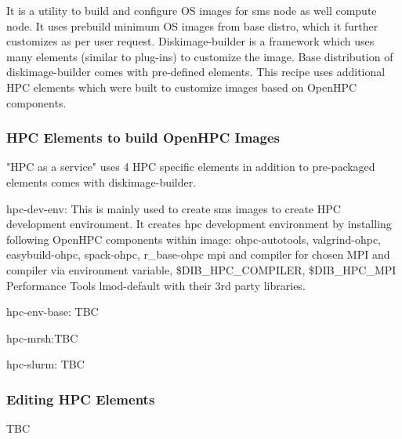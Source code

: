 It is a utility to build and configure OS images for sms node as well compute node. It uses prebuild minimum OS images from base distro, which it further customizes as per user request. Diskimage-builder is a framework which uses many elements (similar to plug-ins) to customize the image. Base distribution of diskimage-builder comes with pre-defined elements. This recipe uses additional HPC elements which were built to customize images based on OpenHPC components.

\subsubsection{HPC Elements to build OpenHPC Images}

"HPC as a service" uses 4 HPC specific elements in addition to pre-packaged elements comes with diskimage-builder.

hpc-dev-env: 
	This is mainly used to create sms images to create HPC development environment. It creates hpc development environment by installing following OpenHPC components within image: 
		ohpc-autotools, valgrind-ohpc, easybuild-ohpc, spack-ohpc, r\_base-ohpc
		mpi and compiler for chosen MPI and compiler via environment variable, \$DIB\_HPC\_COMPILER, \$DIB\_HPC\_MPI
		Performance Tools lmod-default with their 3rd party libraries.

hpc-env-base: TBC

hpc-mrsh:TBC

hpc-slurm: TBC

\subsubsection{Editing HPC Elements}

	TBC

